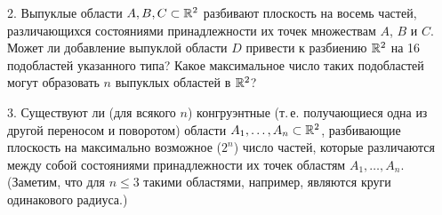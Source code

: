 %
2. Выпуклые области $A,B,C\subset\mathbb R^2$ разбивают плоскость на восемь частей,
различающихся состояниями принадлежности их точек множествам $A$, $B$ и $C$.
Может ли добавление выпуклой области $D$ привести к разбиению $\mathbb R^2$ на 16
подобластей указанного типа? Какое максимальное число таких подобластей
могут образовать $n$ выпуклых областей в $\mathbb R^2$?

3. Существуют ли (для всякого $n$) конгруэнтные (т.\,е. получающиеся одна из
другой переносом и поворотом) области $A_1,\dots,A_n\subset\mathbb R^2$,
разбивающие плоскость на максимально возможное ($2^n$) число частей, которые
различаются между собой состояниями принадлежности их точек областям
$A_1,\dots,A_n$. (Заметим, что для $n\le3$ такими областями, например,
являются круги одинакового радиуса.)

